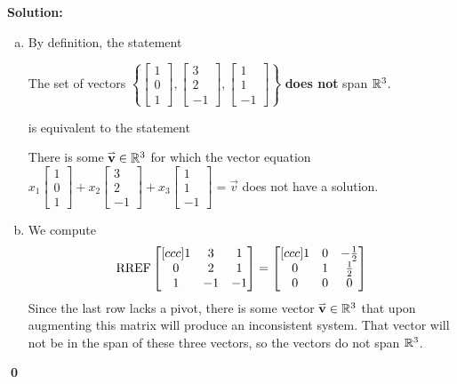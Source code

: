 \documentclass{article}
\newenvironment{solution}
{
  \ignorespaces
  \textbf{Solution:}
}
{
  \ignorespacesafterend
  \begin{flushright}
  {\bfseries \qed}
  \end{flushright}
}
\begin{document}
\begin{solution}
\begin{enumerate}[(a)]
\item By definition, the statement

\begin{center}\begin{minipage}{0.8\textwidth}
The set of vectors
\(\left\{\begin{bmatrix} 1 \\ 0 \\ 1 \end{bmatrix} ,
\begin{bmatrix} 3 \\ 2 \\ -1 \end{bmatrix} , 
\begin{bmatrix} 1 \\ 1 \\ -1 \end{bmatrix} \right\}\) \textbf{does not} span \(\mathbb{R}^3\).
\end{minipage}\end{center}

is equivalent to the statement

\begin{center}\begin{minipage}{0.8\textwidth}
There is some \(\mathbf{\accentset{\rightharpoonup}{v}} \in \mathbb{R}^3\) for which the vector equation
\(x_1\begin{bmatrix} 1 \\ 0 \\ 1 \end{bmatrix}+  
x_2 \begin{bmatrix} 3 \\ 2 \\ -1 \end{bmatrix}+
x_3\begin{bmatrix} 1 \\ 1 \\ -1 \end{bmatrix}=\vec{v}\) does not have a solution.
\end{minipage}\end{center}

\item 
We compute
\[ \operatorname{RREF}
  \begin{bmatrix}[ccc]
  1 & 3 & 1  \\
  0 & 2 & 1  \\
  1 & -1 & -1
  \end{bmatrix}
  =
  \begin{bmatrix}[ccc]
  1 & 0 & -\frac{1}{2} \\
  0 & 1 & \frac{1}{2} \\
  0 & 0 & 0
  \end{bmatrix}
\]
Since the last row lacks a pivot, there is some vector \(\mathbf{\accentset{\rightharpoonup}{v}} \in \mathbb{R}^3\) that upon augmenting this matrix will produce
an inconsistent system. That vector will not be in the span of these three vectors, so the vectors do not span \(\mathbb{R}^3\).
\end{enumerate}
\end{solution}
\end{document}
